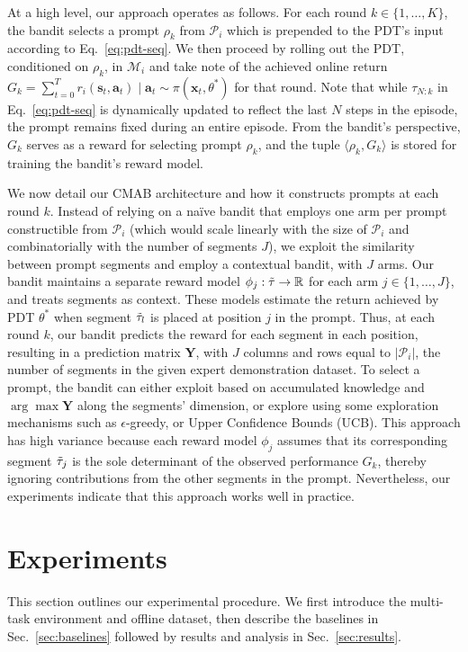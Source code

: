 \documentclass{article}
\begin{document}
At a high level, our approach operates as follows. For each round $k \in \{1, \dots, K \}$, the bandit selects a prompt $\rho_k$ from $\mathcal{P}_i$ which is prepended to the PDT's input according to Eq.~\eqref{eq:pdt-seq}.
We then proceed by rolling out the PDT, conditioned on $\rho_k$, in $\mathcal{M}_i$ and take note of the achieved online return $G_k = \sum_{t=0}^T r_i(\mathbf{s}_t, \mathbf{a}_t) \mid \mathbf{a}_t \sim \pi(\mathbf{x}_t, \theta^*)$ for that round. 
Note that while $\tau_{N:k}$ in Eq.~\eqref{eq:pdt-seq} is dynamically updated to reflect the last $N$ steps in the episode, the prompt remains fixed during an entire episode.
From the bandit's perspective, $G_k$ serves as a reward for selecting prompt $\rho_k$, and the tuple $\langle \rho_k, G_k \rangle$ is stored for training the bandit's reward model.

We now detail our CMAB architecture and how it constructs prompts at each round $k$.
Instead of relying on a na\"ive bandit that employs one arm per prompt constructible from $\mathcal{P}_i$ (which would scale linearly with the size of $\mathcal{P}_i$ and combinatorially with the number of segments $J$), we exploit the similarity between prompt segments and employ a contextual bandit, with $J$ arms.
Our bandit maintains a separate reward model $\phi_j: \Tilde{\tau} \to \mathbb{R}$ for each arm $j \in \{ 1, \dots, J\}$, and treats segments as context.
These models estimate the return achieved by PDT $\theta^*$ when segment $\Tilde{\tau}_l$ is placed at position $j$ in the prompt. 
Thus, at each round $k$, our bandit predicts the reward for each segment in each position, resulting in a prediction matrix $\mathbf{Y}$, with $J$ columns and rows equal to $|\mathcal{P}_i|$, the number of segments in the given expert demonstration dataset.
To select a prompt, the bandit can either exploit based on accumulated knowledge and $\arg \max \mathbf{Y}$ along the segments' dimension, or explore using some exploration mechanisms such as $\epsilon$-greedy, or Upper Confidence Bounds (UCB). This approach has high variance because each reward model $\phi_j$ assumes that its corresponding segment $\Tilde{\tau}_{j}$ is the sole determinant of the observed performance $G_k$, thereby ignoring contributions from the other segments in the prompt. Nevertheless, our experiments indicate that this approach works well in practice.

\section{Experiments}
This section outlines our experimental procedure. We first introduce the multi-task environment and offline dataset, then describe the baselines in Sec.~\ref{sec:baselines} followed by results and analysis in Sec.~\ref{sec:results}.
\end{document}

